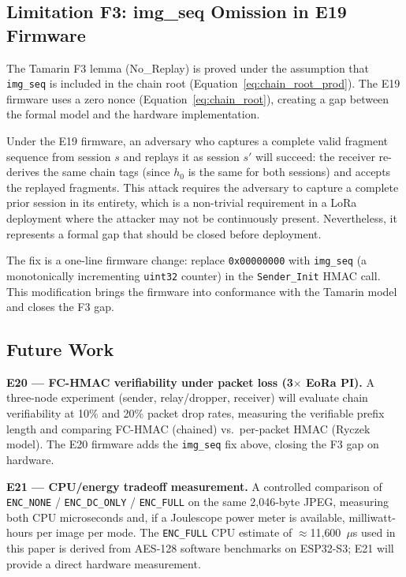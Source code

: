 \documentclass[journal]{IEEEtran}
\begin{document}
\subsection{Limitation F3: img\_seq Omission in E19 Firmware}
\label{sec:limit_f3}

The Tamarin F3 lemma (No\_Replay) is proved under the assumption that
\texttt{img\_seq} is included in the chain root (Equation~\ref{eq:chain_root_prod}).
The E19 firmware uses a zero nonce (Equation~\ref{eq:chain_root}), creating a
gap between the formal model and the hardware implementation.

Under the E19 firmware, an adversary who captures a complete valid fragment
sequence from session $s$ and replays it as session $s'$ will succeed: the
receiver re-derives the same chain tags (since $h_0$ is the same for both
sessions) and accepts the replayed fragments.  This attack requires the
adversary to capture a complete prior session in its entirety, which is a
non-trivial requirement in a LoRa deployment where the attacker may not be
continuously present.  Nevertheless, it represents a formal gap that should be
closed before deployment.

The fix is a one-line firmware change: replace
\texttt{0x00000000} with \texttt{img\_seq} (a monotonically incrementing
\texttt{uint32} counter) in the \texttt{Sender\_Init} HMAC call.  This
modification brings the firmware into conformance with the Tamarin model and
closes the F3 gap.

\subsection{Future Work}
\label{sec:future}

\textbf{E20 --- FC-HMAC verifiability under packet loss (3$\times$ EoRa PI).}
A three-node experiment (sender, relay/dropper, receiver) will evaluate chain
verifiability at 10\% and 20\% packet drop rates, measuring the verifiable
prefix length and comparing FC-HMAC (chained) vs.\ per-packet HMAC (Ryczek
model).  The E20 firmware adds the \texttt{img\_seq} fix above, closing the F3
gap on hardware.

\textbf{E21 --- CPU/energy tradeoff measurement.}
A controlled comparison of \texttt{ENC\_NONE} / \texttt{ENC\_DC\_ONLY} /
\texttt{ENC\_FULL} on the same 2{,}046-byte JPEG, measuring both CPU
microseconds and, if a Joulescope power meter is available, milliwatt-hours per
image per mode.  The \texttt{ENC\_FULL} CPU estimate of $\approx$11{,}600~$\mu$s
used in this paper is derived from AES-128 software benchmarks on ESP32-S3;
E21 will provide a direct hardware measurement.
\end{document}
